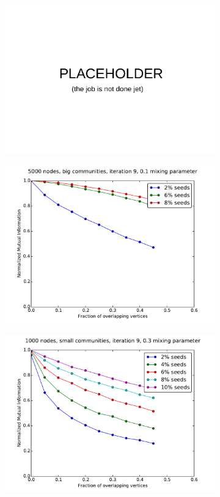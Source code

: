 \begin{figure}
\begin{subfigure}{0.5\textwidth}
    \includegraphics[width=\linewidth]{allplots/placeholder.pdf}
    \end{subfigure}%
    \begin{subfigure}{0.5\textwidth}
    \includegraphics[width=\linewidth]{allplots/overlap_iter_1mu_d.pdf}
    \end{subfigure}
    \begin{subfigure}{0.5\textwidth}
    \includegraphics[width=\linewidth]{allplots/overlap_iter_3mu_a.pdf}

\end{subfigure}
\end{figure}

